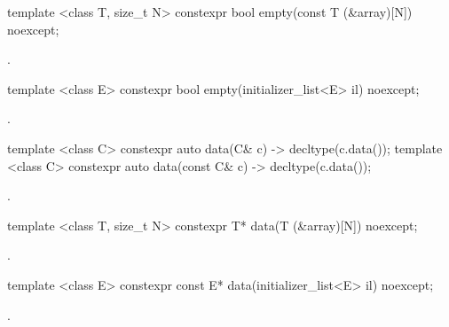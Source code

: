 %
\begin{itemdecl}
template <class T, size_t N> constexpr bool empty(const T (&array)[N]) noexcept;
\end{itemdecl}
\begin{itemdescr}
\pnum \returns {}.
\end{itemdescr}

%
\begin{itemdecl}
template <class E> constexpr bool empty(initializer_list<E> il) noexcept;
\end{itemdecl}
\begin{itemdescr}
\pnum \returns {}.
\end{itemdescr}

%
\begin{itemdecl}
template <class C> constexpr auto data(C& c) -> decltype(c.data());
template <class C> constexpr auto data(const C& c) -> decltype(c.data());
\end{itemdecl}
\begin{itemdescr}
\pnum \returns {}.
\end{itemdescr}

%
\begin{itemdecl}
template <class T, size_t N> constexpr T* data(T (&array)[N]) noexcept;
\end{itemdecl}
\begin{itemdescr}
\pnum \returns {}.
\end{itemdescr}

%
\begin{itemdecl}
template <class E> constexpr const E* data(initializer_list<E> il) noexcept;
\end{itemdecl}
\begin{itemdescr}
\pnum \returns {}.
\end{itemdescr}

